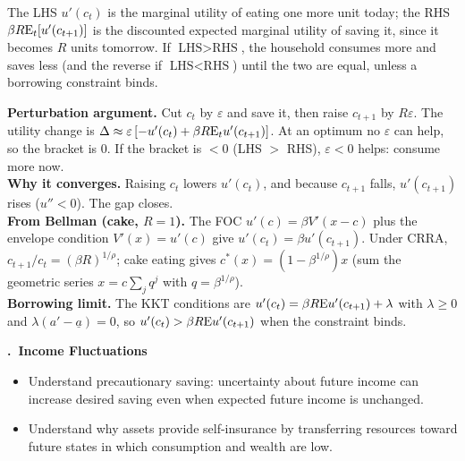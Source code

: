 \documentclass[11pt]{article}
\newcounter{qn}
\newcommand{\question}[1]{\par\needspace{14\baselineskip}\refstepcounter{qn}\medskip
{\bfseries\color{ink}\large \theqn.\ #1}\par\smallskip}
\begin{document}
\begin{resp}
The LHS $u'(c_t)$ is the marginal utility of eating one more unit today; the RHS $\beta R\mathrm{E}_t[u'(c_{t+1})]$ is the discounted expected marginal utility of saving it, since it becomes $R$ units tomorrow. If $\text{LHS}>\text{RHS}$, the household consumes more and saves less (and the reverse if $\text{LHS}<\text{RHS}$) until the two are equal, unless a borrowing constraint binds.
\end{resp}
\begin{intu}
\textbf{Perturbation argument.} Cut $c_t$ by $\varepsilon$ and save it, then raise $c_{t+1}$ by $R\varepsilon$. The utility change is $\Delta\approx\varepsilon\,[-u'(c_t)+\beta R\mathrm{E}_tu'(c_{t+1})]$. At an optimum no $\varepsilon$ can help, so the bracket is $0$. If the bracket is $<0$ (LHS $>$ RHS), $\varepsilon<0$ helps: consume more now.\\
\textbf{Why it converges.} Raising $c_t$ lowers $u'(c_t)$, and because $c_{t+1}$ falls, $u'(c_{t+1})$ rises ($u''<0$). The gap closes.\\
\textbf{From Bellman (cake, $R=1$).} The FOC $u'(c)=\beta V'(x-c)$ plus the envelope condition $V'(x)=u'(c)$ give $u'(c_t)=\beta u'(c_{t+1})$. Under CRRA, $c_{t+1}/c_t=(\beta R)^{1/\rho}$; cake eating gives $c^*(x)=(1-\beta^{1/\rho})x$ (sum the geometric series $x=c\sum_j q^j$ with $q=\beta^{1/\rho}$).\\
\textbf{Borrowing limit.} The KKT conditions are $u'(c_t)=\beta R\mathrm{E} u'(c_{t+1})+\lambda$ with $\lambda\ge0$ and $\lambda(a'-\underline a)=0$, so $u'(c_t)>\beta R\mathrm{E} u'(c_{t+1})$ when the constraint binds.
\end{intu}

\question{Income Fluctuations}
\begin{itemize}[leftmargin=1.2em,itemsep=0pt]\itshape
\item Understand precautionary saving: uncertainty about future income can increase desired saving even when expected future income is unchanged.
\item Understand why assets provide self-insurance by transferring resources toward future states in which consumption and wealth are low.
\end{itemize}
\end{document}
